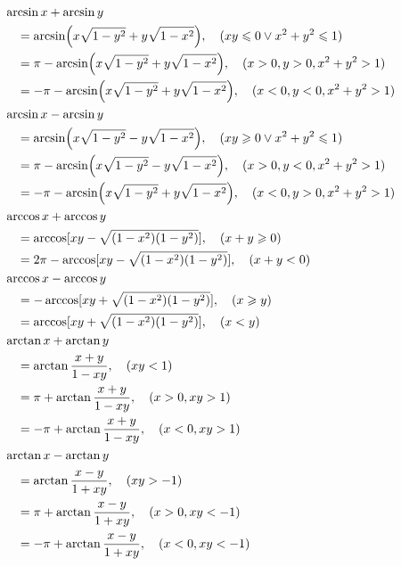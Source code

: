 \begin{theorem}[和差公式]
\begin{align}
&\hspace{-10pt}
\arcsin x + \arcsin y \\
	&= \arcsin(x \sqrt{1-y^2} + y \sqrt{1-x^2}),
		\quad(xy\leqslant0 \lor x^2+y^2\leqslant1) \\
	&= \pi - \arcsin(x \sqrt{1-y^2} + y \sqrt{1-x^2}),
		\quad(x>0, y>0, x^2+y^2>1) \\
	&= -\pi - \arcsin(x \sqrt{1-y^2} + y \sqrt{1-x^2}),
		\quad(x<0, y<0, x^2+y^2>1) \\
&\hspace{-10pt}
\arcsin x - \arcsin y \\
	&= \arcsin(x \sqrt{1-y^2} - y \sqrt{1-x^2}),
		\quad(xy\geqslant0 \lor x^2+y^2\leqslant1) \\
	&= \pi - \arcsin(x \sqrt{1-y^2} - y \sqrt{1-x^2}),
		\quad(x>0, y<0, x^2+y^2>1) \\
	&= -\pi - \arcsin(x \sqrt{1-y^2} + y \sqrt{1-x^2}),
		\quad(x<0, y>0, x^2+y^2>1) \\
&\hspace{-10pt}
\arccos x + \arccos y \\
	&= \arccos[xy - \sqrt{(1-x^2)(1-y^2)}],
		\quad(x+y\geqslant0) \\
	&= 2\pi - \arccos[xy - \sqrt{(1-x^2)(1-y^2)}],
		\quad(x+y<0) \\
&\hspace{-10pt}
\arccos x - \arccos y \\
	&= -\arccos[xy + \sqrt{(1-x^2)(1-y^2)}],
		\quad(x \geqslant y) \\
	&= \arccos[xy + \sqrt{(1-x^2)(1-y^2)}],
		\quad(x<y) \\
&\hspace{-10pt}
\arctan x + \arctan y \\
	&= \arctan\frac{x+y}{1-xy},
		\quad(xy<1) \\
	&= \pi+\arctan\frac{x+y}{1-xy},
		\quad(x>0,xy>1) \\
	&= -\pi+\arctan\frac{x+y}{1-xy},
		\quad(x<0,xy>1) \\
&\hspace{-10pt}
\arctan x - \arctan y \\
	&= \arctan\frac{x-y}{1+xy},
		\quad(xy>-1) \\
	&= \pi+\arctan\frac{x-y}{1+xy},
		\quad(x>0,xy<-1) \\
	&= -\pi+\arctan\frac{x-y}{1+xy},
		\quad(x<0,xy<-1)
\end{align}
\end{theorem}

